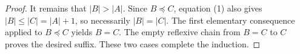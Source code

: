 \begin{proof}
It remains that \(|B|>|A|\).  Since \(B\preccurlyeq C\), equation (1)
also gives \(|B|\leq |C|=|A|+1\), so necessarily \(|B|=|C|\).  The first
elementary consequence applied to \(B\preccurlyeq C\) yields \(B=C\).
The empty reflexive chain from \(B=C\) to \(C\) proves the desired suffix.
These two cases complete the induction.
\end{proof}
